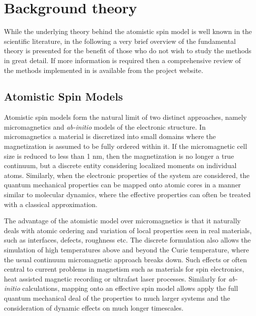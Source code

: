 \chapter{Background theory}\label{chap:theory}
While the underlying theory behind the atomistic spin model is well known in the scientific literature, in the following a very brief overview of the fundamental theory is presented for the benefit of those who do not wish to study the methods in great detail. If more information is required then a comprehensive review of the methods implemented in \vampire is available from the project website.

\section*{Atomistic Spin Models}
Atomistic spin models form the natural limit of two distinct approaches, namely micromagnetics and \textit{ab-initio} models of the electronic structure. In micromagnetics a material is discretized into small domains where the magnetization is assumed to be fully ordered within it. If the micromagnetic cell size is reduced to less than 1 nm, then the magnetization is no longer a true continuum, but a discrete entity considering localized moments on individual atoms. Similarly, when the electronic properties of the system are considered, the quantum mechanical properties can be mapped onto atomic cores in a manner similar to molecular dynamics, where the effective properties can often be treated with a classical approximation.

The advantage of the atomistic model over micromagnetics is that it naturally deals with atomic ordering and variation of local properties seen in real materials, such as interfaces, defects, roughness etc. The discrete formulation also allows the simulation of high temperatures above and beyond the Curie temperature, where the usual continuum micromagnetic approach breaks down. Such effects or often central to current problems in magnetism such as materials for spin electronics, heat assisted magnetic recording or ultrafast laser processes. Similarly for \textit{ab-initio} calculations, mapping onto an effective spin model allows apply the full quantum mechanical deal of the properties to much larger systems and the consideration of dynamic effects on much longer timescales.

